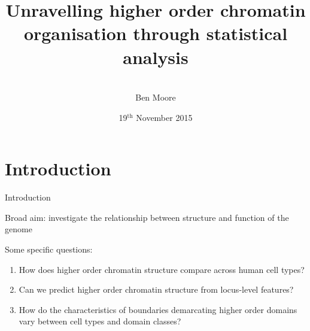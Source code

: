 \documentclass{beamer}
\title[Unravelling higher order chromatin organisation through statistical analysis] %
{ {\large Unravelling higher order chromatin organisation through statistical analysis } }
\author[ \insertlogo{} ] 
{\vspace{15ex} \\
Ben Moore
\vspace{-4ex} }
\date{19$^{\mathrm{th}}$ November 2015}
\begin{document}
{
\begin{frame}
\titlepage
\end{frame}
}


\section{Introduction}

\begin{frame}{Introduction}

Broad aim: investigate the relationship between structure and function of the genome

\vspace{2em}
Some specific questions:

\begin{enumerate}
\item How does higher order chromatin structure compare across human cell types?
\item Can we predict higher order chromatin structure from locus-level features?
\item How do the characteristics of boundaries demarcating higher order domains vary between cell types and domain classes?
\end{enumerate}

\end{frame}
\end{document}
